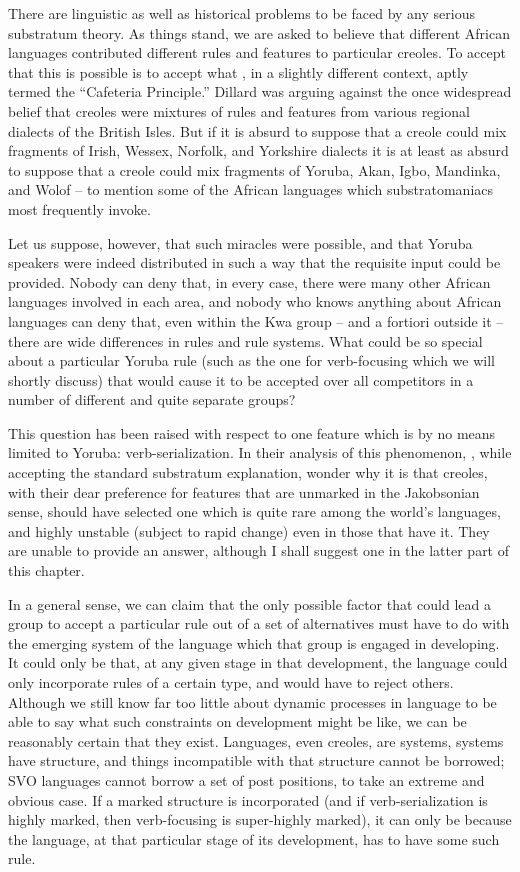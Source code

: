 There are linguistic as well as historical problems to be faced by any serious substratum theory. As things stand, we are asked to believe that different African languages contributed different rules and features to particular creoles. To accept that this is possible is to accept what \citet{Dillard1970}, in a slightly different context, aptly termed the ``Cafe\-teria Principle.'' Dillard was arguing against the once widespread belief that creoles were mixtures of rules and features from various regional dialects of the British Isles. But if it is absurd to suppose that a creole could mix fragments of Irish, Wessex, Norfolk, and Yorkshire dialects it is at least as absurd to suppose that a creole could mix fragments of Yoruba, Akan, Igbo, Mandinka, and Wolof -- to mention some of the African languages which substratomaniacs most frequently invoke.

Let us suppose, however, that such miracles were possible, and that Yoruba speakers were indeed distributed in such a way that the
requisite input could be provided. Nobody can deny that, in every case, there were many other African languages involved in each area, and nobody who knows anything about African languages can deny that, even within the Kwa group -- and a fortiori outside it -- there are wide differences in rules and rule systems. What could be so special about a particular Yoruba rule (such as the one for verb-focusing which we will shortly discuss) that would cause it to be accepted over all compe\-titors in a number of different and quite separate groups?

This question has been raised with respect to one feature which is by no means limited to Yoruba: verb-serialization. In their analysis of this phenomenon, \citet{JansenEtAl1978}, while accepting the standard substratum explanation, wonder why it is that creoles, with their dear preference for features that are unmarked in the Jakobsonian sense, should have selected one which is quite rare among the world's languages, and highly unstable (subject to rapid change) even in those that have it. They are unable to provide an answer, although I shall suggest one in the latter part of this chapter.

In a general sense, we can claim that the only possible factor that could lead a group to accept a particular rule out of a set of alternatives must have to do with the emerging system of the language which that group is engaged in developing. It could only be that, at any given stage in that development, the language could only incorpor\-ate rules of a certain type, and would have to reject others. Although we still know far too little about dynamic processes in language to be able to say what such constraints on development might be like, we can be reasonably certain that they exist. Languages, even creoles, are systems, systems have structure, and things incompatible with that structure cannot be borrowed; SVO languages cannot borrow a set of post positions, to take an extreme and obvious case. If a marked struc\-ture is incorporated (and if verb-serialization is highly marked, then verb-focusing is super-highly marked), it can only be because the language, at that particular stage of its development, has to have some such rule.

